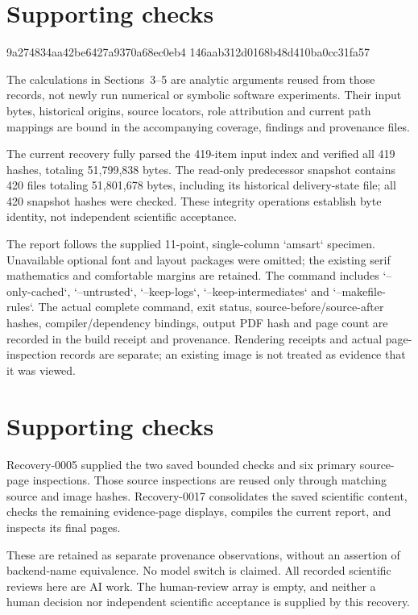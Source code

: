 \documentclass[10pt]{article}
\begin{document}
\section*{Supporting checks}
9a274834aa42be6427a9370a68ec0eb4
146aab312d0168b48d410ba0cc31fa57\par
The calculations in Sections 3–5 are analytic arguments reused from those records, not newly run numerical or symbolic software experiments. Their input bytes, historical origins, source locators, role attribution and current path mappings are bound in the accompanying coverage, findings and provenance files.\par
The current recovery fully parsed the 419-item input index and verified all 419 hashes, totaling 51,799,838 bytes. The read-only predecessor snapshot contains 420 files totaling 51,801,678 bytes, including its historical delivery-state file; all 420 snapshot hashes were checked. These integrity operations establish byte identity, not independent scientific acceptance.\par
The report follows the supplied 11-point, single-column `amsart` specimen. Unavailable optional font and layout packages were omitted; the existing serif mathematics and comfortable margins are retained. The command includes `–only-cached`, `–untrusted`, `–keep-logs`, `–keep-intermediates` and `–makefile-rules`. The actual complete command, exit status, source-before/source-after hashes, compiler/dependency bindings, output PDF hash and page count are recorded in the build receipt and provenance. Rendering receipts and actual page-inspection records are separate; an existing image is not treated as evidence that it was viewed.\par
\section*{Supporting checks}
Recovery-0005 supplied the two saved bounded checks and six primary source-page inspections. Those source inspections are reused only through matching source and image hashes. Recovery-0017 consolidates the saved scientific content, checks the remaining evidence-page displays, compiles the current report, and inspects its final pages.\par
These are retained as separate provenance observations, without an assertion of backend-name equivalence. No model switch is claimed. All recorded scientific reviews here are AI work. The human-review array is empty, and neither a human decision nor independent scientific acceptance is supplied by this recovery.\par
\end{document}
